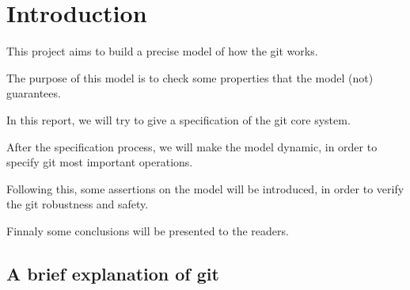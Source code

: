 \section{Introduction}

This project aims to build a precise model of how the git works. \par
The purpose of this model is to check some properties that the model
(not) guarantees.\par
In this report, we will try to give a specification
of the git core system. \par
After the specification process, we will make the
model dynamic, in order to specify git most important operations. \par
Following this, some assertions on the model will be
introduced, in order
to verify the git robustness and safety. \par
Finnaly some conclusions will be presented to the readers.

\subsection{A brief explanation of git}
